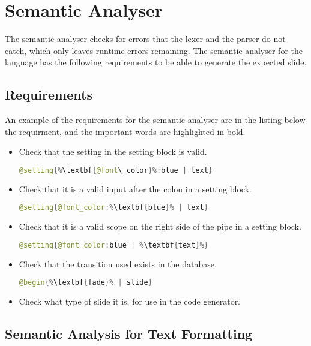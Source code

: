 \chapter{Semantic Analyser}

The semantic analyser checks for errors that the lexer and the parser do not catch, which only leaves runtime errors remaining. The semantic analyser for the language has the following requirements to be able to generate the expected slide.

\section{Requirements}
An example of the requirements for the semantic analyser are in the listing below the requirment, and the important words are highlighted in bold.
\begin{itemize}
	\item Check that the setting in the setting block is valid.
		\begin{lstlisting}[frame=single, language=java]
	@setting{%\textbf{@font\_color}%:blue | text}
	\end{lstlisting}
	\item Check that it is a valid input after the colon in a setting block.
		\begin{lstlisting}[frame=single, language=java]
	@setting{@font_color:%\textbf{blue}% | text}
	\end{lstlisting}
	\item Check that it is a valid scope on the right side of the pipe in a setting block.
	\begin{lstlisting}[frame=single, language=java]
	@setting{@font_color:blue | %\textbf{text}%}
	\end{lstlisting}
	\item Check that the transition used exists in the database.
		\begin{lstlisting}[frame=single, language=java]
	@begin{%\textbf{fade}% | slide}
	\end{lstlisting}
	\item Check what type of slide it is, for use in the code generator.
\end{itemize}


\section{Semantic Analysis for Text Formatting}

